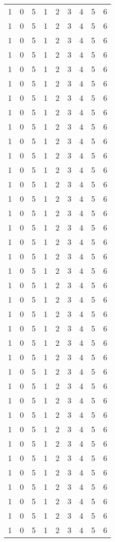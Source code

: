 {\begin{longtable}{ccccccccc}
  1     & 0 & 5  & 1  & 2  & 3  & 4  &  5 & 6 \\
  1     & 0 & 5  & 1  & 2  & 3  & 4  &  5 & 6 \\
  1     & 0 & 5  & 1  & 2  & 3  & 4  &  5 & 6 \\
  1     & 0 & 5  & 1  & 2  & 3  & 4  &  5 & 6 \\
  1     & 0 & 5  & 1  & 2  & 3  & 4  &  5 & 6 \\
  1     & 0 & 5  & 1  & 2  & 3  & 4  &  5 & 6 \\
  1     & 0 & 5  & 1  & 2  & 3  & 4  &  5 & 6 \\
  1     & 0 & 5  & 1  & 2  & 3  & 4  &  5 & 6 \\
  1     & 0 & 5  & 1  & 2  & 3  & 4  &  5 & 6 \\
  1     & 0 & 5  & 1  & 2  & 3  & 4  &  5 & 6 \\
  1     & 0 & 5  & 1  & 2  & 3  & 4  &  5 & 6 \\
  1     & 0 & 5  & 1  & 2  & 3  & 4  &  5 & 6 \\
  1     & 0 & 5  & 1  & 2  & 3  & 4  &  5 & 6 \\
  1     & 0 & 5  & 1  & 2  & 3  & 4  &  5 & 6 \\
  1     & 0 & 5  & 1  & 2  & 3  & 4  &  5 & 6 \\
  1     & 0 & 5  & 1  & 2  & 3  & 4  &  5 & 6 \\
  1     & 0 & 5  & 1  & 2  & 3  & 4  &  5 & 6 \\
  1     & 0 & 5  & 1  & 2  & 3  & 4  &  5 & 6 \\
  1     & 0 & 5  & 1  & 2  & 3  & 4  &  5 & 6 \\
  1     & 0 & 5  & 1  & 2  & 3  & 4  &  5 & 6 \\
  1     & 0 & 5  & 1  & 2  & 3  & 4  &  5 & 6 \\
  1     & 0 & 5  & 1  & 2  & 3  & 4  &  5 & 6 \\
  1     & 0 & 5  & 1  & 2  & 3  & 4  &  5 & 6 \\
  1     & 0 & 5  & 1  & 2  & 3  & 4  &  5 & 6 \\
  1     & 0 & 5  & 1  & 2  & 3  & 4  &  5 & 6 \\
  1     & 0 & 5  & 1  & 2  & 3  & 4  &  5 & 6 \\
  1     & 0 & 5  & 1  & 2  & 3  & 4  &  5 & 6 \\
  1     & 0 & 5  & 1  & 2  & 3  & 4  &  5 & 6 \\
  1     & 0 & 5  & 1  & 2  & 3  & 4  &  5 & 6 \\
  1     & 0 & 5  & 1  & 2  & 3  & 4  &  5 & 6 \\
  1     & 0 & 5  & 1  & 2  & 3  & 4  &  5 & 6 \\
  1     & 0 & 5  & 1  & 2  & 3  & 4  &  5 & 6 \\
  1     & 0 & 5  & 1  & 2  & 3  & 4  &  5 & 6 \\
  1     & 0 & 5  & 1  & 2  & 3  & 4  &  5 & 6 \\
  1     & 0 & 5  & 1  & 2  & 3  & 4  &  5 & 6 \\
  1     & 0 & 5  & 1  & 2  & 3  & 4  &  5 & 6 \\
  1     & 0 & 5  & 1  & 2  & 3  & 4  &  5 & 6 \\


\end{longtable}}
